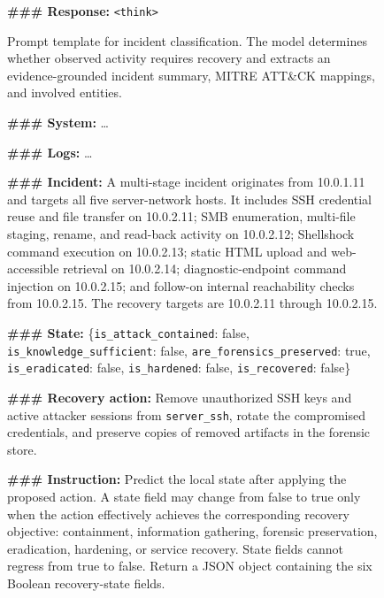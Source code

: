 \documentclass[sigconf]{acmart}
\begin{document}
\begin{figure}
\begin{tcolorbox}[
  title=Incident Classification Prompt Template,
  colback=Purple!5,
  colframe=Purple!60,
  boxrule=0.5pt,
  arc=2pt,
  left=5pt,
  right=5pt,
  top=5pt,
  bottom=5pt]
\textbf{\#\#\# Response:}
\texttt{<think>}
\end{tcolorbox}
\caption{Prompt template for incident classification. The model determines
whether observed activity requires recovery and extracts an evidence-grounded
incident summary, MITRE ATT\&CK mappings, and involved entities.}
\label{fig:incident-prompt}
\end{figure}



\begin{figure}
\centering
\begin{tcolorbox}[
  title=Local-State Generation Prompt Template,
  colback=bluetwo!10,
  colframe=bluetwo,
  boxrule=0.5pt,
  arc=2pt,
  left=5pt,
  right=5pt,
  top=5pt,
  bottom=5pt]
\footnotesize
\textbf{\#\#\# System:} \ldots

\textbf{\#\#\# Logs:} \ldots

\textbf{\#\#\# Incident:} A multi-stage incident originates from 10.0.1.11 and targets all five server-network hosts. It includes SSH credential reuse and file transfer on 10.0.2.11; SMB enumeration, multi-file staging, rename, and read-back activity on 10.0.2.12; Shellshock command execution on 10.0.2.13; static HTML upload and web-accessible retrieval on 10.0.2.14; diagnostic-endpoint command injection on 10.0.2.15; and follow-on internal reachability checks from 10.0.2.15. The recovery targets are 10.0.2.11 through 10.0.2.15.

\textbf{\#\#\# State:}
\{\texttt{is\_attack\_contained}: false,
\texttt{is\_knowledge\_sufficient}: false,
\texttt{are\_forensics\_preserved}: true,
\texttt{is\_eradicated}: false,
\texttt{is\_hardened}: false,
\texttt{is\_recovered}: false\}

\textbf{\#\#\# Recovery action:}\newline
Remove unauthorized SSH keys and active attacker sessions from \texttt{server\_ssh}, rotate the compromised credentials, and preserve copies of removed artifacts in the forensic store.

\textbf{\#\#\# Instruction:}
Predict the local state after applying the proposed action. A state field may change from false to true only when the action effectively achieves the corresponding recovery objective: containment, information gathering, forensic preservation, eradication, hardening, or service recovery. State fields cannot regress from true to false. Return a JSON object containing the
six Boolean recovery-state fields.


\end{tcolorbox}
\end{figure}
\end{document}
